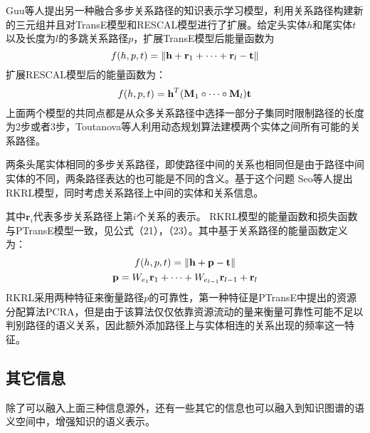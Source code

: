 \documentclass[twocolumn]{article}
\newcommand{\upcite}[1]{\textsuperscript{\textsuperscript{\cite{#1}}}}
\begin{document}
Guu等人\upcite{Guu}提出另一种融合多步关系路径的知识表示学习模型，利用关系路径构建新的三元组并且对TransE模型和RESCAL\upcite{RESCAL}模型进行了扩展。给定头实体$h$和尾实体$t$以及长度为$l$的多跳关系路径$p$，扩展TransE模型后能量函数为
\begin{equation}
	f(h,p,t)=\left \| \textbf{h}+\textbf{r}_1+\cdots+\textbf{r}_l-\textbf{t} \right \| \notag
\end{equation}
扩展RESCAL模型后的能量函数为：
\begin{equation}
	f(h,p,t)=\textbf{h}^T(\textbf{M}_1\circ\cdots\circ\textbf{M}_l)\textbf{t} \notag
\end{equation}
上面两个模型的共同点都是从众多关系路径中选择一部分子集同时限制路径的长度为2步或者3步，Toutanova等人\upcite{Toutanova}利用动态规划算法建模两个实体之间所有可能的关系路径。

两条头尾实体相同的多步关系路径，即使路径中间的关系也相同但是由于路径中间实体的不同，两条路径表达的也可能是不同的含义。基于这个问题
Seo等人\upcite{RKRL}提出RKRL模型，同时考虑关系路径上中间的实体和关系信息。

其中$\textbf{r}_i$代表多步关系路径上第$i$个关系的表示。
RKRL模型的能量函数和损失函数与PTransE模型一致，见公式（21），（23）。其中基于关系路径的能量函数定义为：
\begin{gather}
f(h,p,t)=\left \|\textbf{h}+\textbf{p}-\textbf{t} \right \| \notag \\
\textbf{p}=W_{e_1}\textbf{r}_1+\cdots+W_{e_{l-1}}\textbf{r}_{l-1}+\textbf{r}_l \notag
\end{gather}
RKRL采用两种特征来衡量路径$p$的可靠性，第一种特征是PTransE中提出的资源分配算法PCRA，但是由于该算法仅仅依靠资源流动的量来衡量可靠性可能不足以判别路径的语义关系，因此额外添加路径上与实体相连的关系出现的频率这一特征。


\subsection{其它信息}
除了可以融入上面三种信息源外，还有一些其它的信息也可以融入到知识图谱的语义空间中，增强知识的语义表示。
\end{document}
